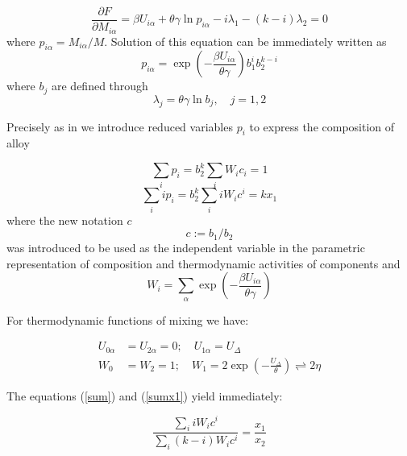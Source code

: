 \documentclass[12pt,abstract]{scrartcl}
\begin{document}
\begin{equation} \label{basic_equation}
    \frac{\partial F}{\partial M_{i\alpha}} = \beta U_{i \alpha} + \theta \gamma \ln p_{i \alpha} - i \lambda_1 - (k-i) \lambda_2 = 0 
\end{equation}
where $ p_{i\alpha} =  M_{i\alpha} / M$.
Solution of this equation can be immediately written as
\begin{equation} \label{pia}
    p_{i\alpha} = \exp \left(- {\frac{\beta U_{i \alpha}}{\theta\gamma }}\right) b_1^i b_2^{k-i}
\end{equation}
where $b_j$ are defined through
\begin{equation}
    \lambda_j = \theta \gamma \ln b_j, \quad j = 1, 2
\end{equation}

Precisely as in  \cite{TISR_p1} we introduce reduced variables $p_i$ to express the composition of alloy

\begin{equation} \label{sum}
    \sum_i p_i = b_2^k \sum_i W_i c_i = 1 
\end{equation}
\begin{equation} \label{sumx1}
    \sum_i i p_i = b_2^k \sum_i i W_i c^i = k x_1 
\end{equation}
where the new notation $c$ 
\begin{equation} \label{c=}
    c := b_1 / b_2
\end{equation}
was introduced to be used as the independent variable in the parametric representation of composition and thermodynamic activities of components and 
\begin{equation} \label{Wi}
    W_i = \sum_\alpha \exp \left(- {\frac{\beta U_{i \alpha}}{\theta\gamma }}\right)
\end{equation}

For thermodynamic functions of mixing we have:

\begin{equation} \label{W0-1}
\begin{split}
 U_{0\alpha} & =  U_{2 \alpha} = 0; \quad   U_{1 \alpha} = U_\Delta \\ W_0  &= W_2 = 1; \quad 
W_1 = 2 \exp \left({- \frac{U_\Delta}{\theta}} \right) \rightleftharpoons  2 \eta
\end{split}
\end{equation}

The equations (\ref{sum}) and  (\ref{sumx1}) yield immediately:

\begin{equation}
\frac{\sum_i i W_i c^i}{\sum_i (k - i) W_i c^i} = \frac{ x_1}{x_2}
\end{equation}
\end{document}

